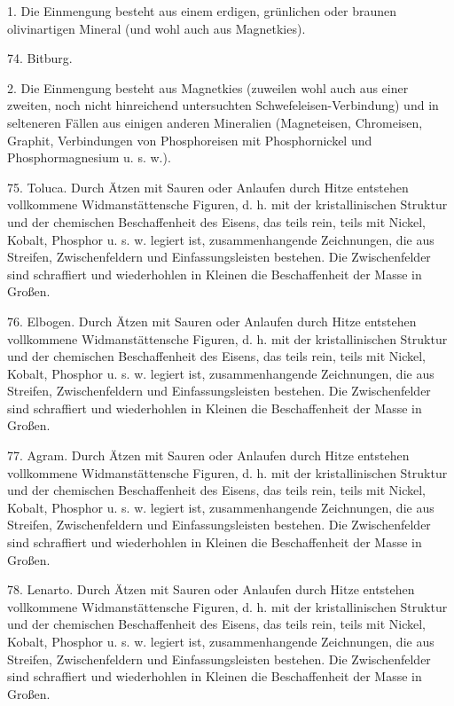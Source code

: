 \documentclass[a4paper, 11pt, oneside, polutonikogreek, german]{article}
\begin{document}
\vspace{2ex}

1. Die Einmengung besteht aus einem erdigen, grünlichen oder braunen olivinartigen Mineral (und wohl auch aus Magnetkies).

\vspace{2ex}

74. Bitburg.

\vspace{2ex}

2. Die Einmengung besteht aus Magnetkies (zuweilen wohl auch aus einer zweiten, noch nicht hinreichend untersuchten Schwefeleisen-Verbindung) und in selteneren Fällen aus einigen anderen Mineralien (Magneteisen, Chromeisen, Graphit, Verbindungen von Phosphoreisen mit Phosphornickel und Phosphormagnesium u. s. w.).

\vspace{2ex}

75. Toluca. Durch Ätzen mit Sauren oder Anlaufen durch Hitze entstehen vollkommene Widmanstättensche Figuren, d. h. mit der kristallinischen Struktur und der chemischen Beschaffenheit des Eisens, das teils rein, teils mit Nickel, Kobalt, Phosphor u. s. w. legiert ist, zusammenhangende Zeichnungen, die aus Streifen, Zwischenfeldern und Einfassungsleisten bestehen. Die Zwischenfelder sind schraffiert und wiederhohlen in Kleinen die Beschaffenheit der Masse in Großen.

76. Elbogen. Durch Ätzen mit Sauren oder Anlaufen durch Hitze entstehen vollkommene Widmanstättensche Figuren, d. h. mit der kristallinischen Struktur und der chemischen Beschaffenheit des Eisens, das teils rein, teils mit Nickel, Kobalt, Phosphor u. s. w. legiert ist, zusammenhangende Zeichnungen, die aus Streifen, Zwischenfeldern und Einfassungsleisten bestehen. Die Zwischenfelder sind schraffiert und wiederhohlen in Kleinen die Beschaffenheit der Masse in Großen.

77. Agram. Durch Ätzen mit Sauren oder Anlaufen durch Hitze entstehen vollkommene Widmanstättensche Figuren, d. h. mit der kristallinischen Struktur und der chemischen Beschaffenheit des Eisens, das teils rein, teils mit Nickel, Kobalt, Phosphor u. s. w. legiert ist, zusammenhangende Zeichnungen, die aus Streifen, Zwischenfeldern und Einfassungsleisten bestehen. Die Zwischenfelder sind schraffiert und wiederhohlen in Kleinen die Beschaffenheit der Masse in Großen.

78. Lenarto. Durch Ätzen mit Sauren oder Anlaufen durch Hitze entstehen vollkommene Widmanstättensche Figuren, d. h. mit der kristallinischen Struktur und der chemischen Beschaffenheit des Eisens, das teils rein, teils mit Nickel, Kobalt, Phosphor u. s. w. legiert ist, zusammenhangende Zeichnungen, die aus Streifen, Zwischenfeldern und Einfassungsleisten bestehen. Die Zwischenfelder sind schraffiert und wiederhohlen in Kleinen die Beschaffenheit der Masse in Großen.
\end{document}

